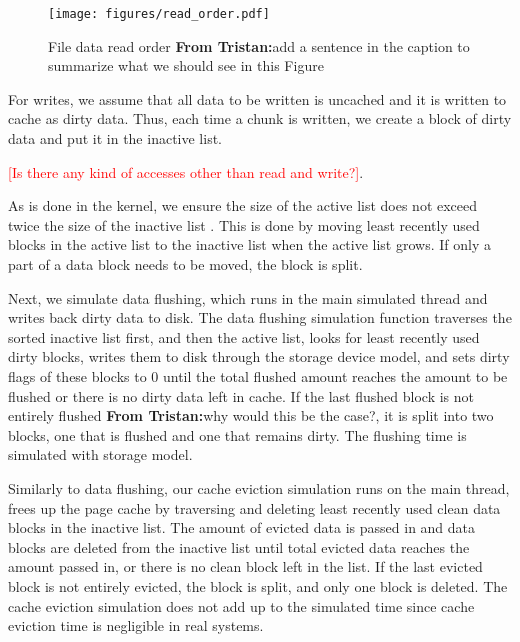\documentclass[conference]{IEEEtran}
\newcommand{\tristan}[1]{\color{orange}\textbf{From Tristan:}#1\color{black}}
\begin{document}
			\begin{figure}
   				\centering
   				\texttt{[image: figures/read\_order.pdf]}
   				\caption{File data read order \tristan{add a sentence in the caption to summarize what we should see in this Figure}}	\label{fig:read_order}
			\end{figure}	
			
			For writes, we assume that all data to be written is 
			uncached and it is written to cache as dirty data. 
			Thus, each time a chunk is written, we create a block of dirty data and 
			put it in the inactive list.
			
			\textcolor{red}{[Is there any kind of accesses other than read and write?]}. 			
			
            As is done in the kernel, we ensure the size of the active list does not 
            exceed twice the size of the inactive list 
			\cite{gorman2004understanding, linuxdev3rd2010}. 
			This is done by moving least recently used blocks in the active list 
			to the inactive list when the active list grows. If only a part of a data 
			block needs to be moved, the block is split.

			Next, we simulate data flushing, which runs in the main simulated 
			thread and writes back dirty data to disk. 
			The data flushing simulation function traverses the sorted 
			inactive list first, and then the active list, looks for least recently used 
			dirty blocks, writes them to disk through the storage device model, 
			and sets dirty flags of these blocks to 0 until the total flushed amount 
			reaches the amount to be flushed or there is no dirty data left in cache. 
			If the last flushed block is not entirely flushed \tristan{why would this be the case?}, it is split into 
			two blocks, one that is flushed and one that remains dirty.
			The flushing time is simulated with storage model.
				
			Similarly to data flushing, our cache eviction simulation runs on 
			the main thread, frees up the page cache by traversing and deleting 
			least recently used clean data blocks in the inactive list.
			The amount of evicted data is passed in and data blocks are deleted 
			from the inactive list until total evicted data reaches the amount 
			passed in, or there is no clean block left in the list.
			If the last evicted block is not entirely evicted, the block is split, 
			and only one block is deleted.
			The cache eviction simulation does not add up to the simulated time 
			since cache eviction time is negligible in real systems.		
			
\end{document}
